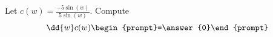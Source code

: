 \documentclass{ximera}
\author{Bart Snapp}
\begin{document}
\begin{exercise}
Let $c(w) = \frac{ -5 \sin (w)}{5 \sin (w)}$. Compute
\[
\dd{w}c(w)
\begin{prompt}=\answer{0}\end{prompt}
\]
\end{exercise}
\end{document}
